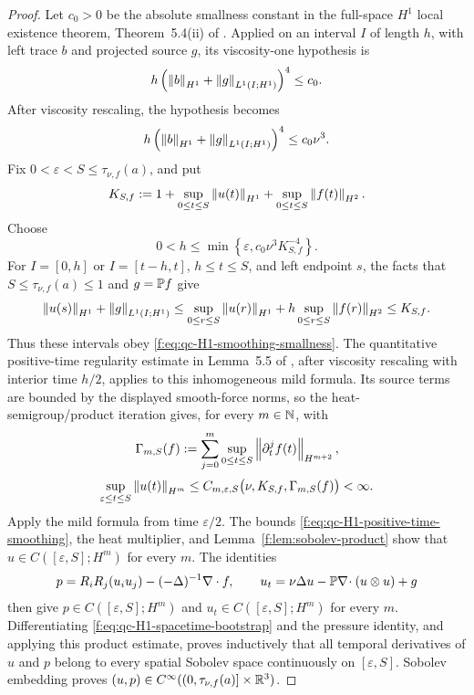 \begin{proof}
Let \(c_0>0\) be the absolute smallness constant in the full-space
\(H^1\) local existence theorem, Theorem~5.4(ii) of \cite{Tao2013}.
Applied on an interval \(I\) of length \(h\), with left trace \(b\) and
projected source \(g\), its viscosity-one hypothesis is
\[
 h\left(\left\lVert b\right\rVert_{H^1}+\left\lVert g\right\rVert_{L^1(I;H^1)}\right)^4\le c_0.
\]
After viscosity rescaling, the hypothesis becomes
\begin{equation}
 h\left(\left\lVert b\right\rVert_{H^1}+\left\lVert g\right\rVert_{L^1(I;H^1)}\right)^4
 \le c_0\nu^3.
 \label{f:eq:qc-H1-smoothing-smallness}
\end{equation}
Fix \(0<\varepsilon<S\le\tau_{\nu,f}(a)\), and put
\[
 K_{S,f}:=1+\sup_{0\le t\le S}\left\lVert u(t)\right\rVert_{H^1}
 +\sup_{0\le t\le S}\left\lVert f(t)\right\rVert_{H^2}.
\]
Choose
\[
 0<h\le\min\left\{\varepsilon,
 c_0\nu^3K_{S,f}^{-4}\right\}.
\]
For \(I=[0,h]\) or \(I=[t-h,t]\), \(h\le t\le S\), and left endpoint
\(s\), the facts that \(S\le\tau_{\nu,f}(a)\le1\) and
\(g=\mathbb P f\) give
\[
 \left\lVert u(s)\right\rVert_{H^1}+\left\lVert g\right\rVert_{L^1(I;H^1)}
 \le \sup_{0\le r\le S}\left\lVert u(r)\right\rVert_{H^1}
 +h\sup_{0\le r\le S}\left\lVert f(r)\right\rVert_{H^2}
 \le K_{S,f}.
\]
Thus these intervals obey \eqref{f:eq:qc-H1-smoothing-smallness}.  The
quantitative positive-time regularity estimate in Lemma~5.5 of
\cite{Tao2013}, after viscosity rescaling with interior time \(h/2\), applies
to this inhomogeneous mild formula.  Its source terms are bounded by the
displayed smooth-force norms, so the heat-semigroup/product iteration gives,
for every \(m\in\mathbb N\), with
\[
 \Gamma_{m,S}(f):=
 \sum_{j=0}^{m}\sup_{0\le t\le S}
 \left\lVert \partial_t^jf(t)\right\rVert_{H^{m+2}},
\]
\begin{equation}
 \sup_{\varepsilon\le t\le S}\left\lVert u(t)\right\rVert_{H^m}
 \le C_{m,\varepsilon,S}
 \bigl(\nu,K_{S,f},\Gamma_{m,S}(f)\bigr)<\infty.
 \label{f:eq:qc-H1-positive-time-smoothing}
\end{equation}
Apply the mild formula from time \(\varepsilon/2\).  The bounds
\eqref{f:eq:qc-H1-positive-time-smoothing}, the heat multiplier, and
Lemma~\ref{f:lem:sobolev-product} show that
\(u\in C([\varepsilon,S];H^m)\) for every \(m\).  The identities
\begin{equation}
 p=R_iR_j(u_i u_j)-(-\Delta)^{-1}\nabla\cdot f,
 \qquad
 u_t=\nu\Delta u-\mathbb P\nabla\!\cdot(u\otimes u)+g
 \label{f:eq:qc-H1-spacetime-bootstrap}
\end{equation}
then give
\(p\in C([\varepsilon,S];H^m)\) and
\(u_t\in C([\varepsilon,S];H^m)\) for every \(m\).  Differentiating
\eqref{f:eq:qc-H1-spacetime-bootstrap} and the pressure identity, and applying
this product estimate, proves inductively that all temporal derivatives
of \(u\) and \(p\) belong to every spatial Sobolev space continuously on
\([\varepsilon,S]\).  Sobolev embedding proves
\((u,p)\in C^\infty((0,\tau_{\nu,f}(a)]\times\mathbb R^3)\).


\end{proof}
